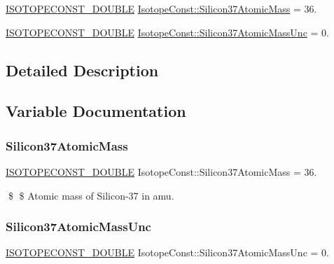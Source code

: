 \begin{DoxyCompactItemize}
\item 
\mbox{\hyperlink{group___isotope_const-_macros_ga8f45a7272ce02c0b4c65c44636ed719a}{I\+S\+O\+T\+O\+P\+E\+C\+O\+N\+S\+T\+\_\+\+D\+O\+U\+B\+LE}} \mbox{\hyperlink{group___isotope_const-_silicon-_si37_gaab3633657f6d05bbedd5118100ca326c}{Isotope\+Const\+::\+Silicon37\+Atomic\+Mass}} = 36.
\item 
\mbox{\hyperlink{group___isotope_const-_macros_ga8f45a7272ce02c0b4c65c44636ed719a}{I\+S\+O\+T\+O\+P\+E\+C\+O\+N\+S\+T\+\_\+\+D\+O\+U\+B\+LE}} \mbox{\hyperlink{group___isotope_const-_silicon-_si37_gaa46a1d41cb6ac6a76ff8424a2a5dbd29}{Isotope\+Const\+::\+Silicon37\+Atomic\+Mass\+Unc}} = 0.
\end{DoxyCompactItemize}


\subsection{Detailed Description}


\subsection{Variable Documentation}
\mbox{\label{group___isotope_const-_silicon-_si37_gaab3633657f6d05bbedd5118100ca326c}} 
\subsubsection{\texorpdfstring{Silicon37\+Atomic\+Mass}{Silicon37AtomicMass}}
{\footnotesize\ttfamily \mbox{\hyperlink{group___isotope_const-_macros_ga8f45a7272ce02c0b4c65c44636ed719a}{I\+S\+O\+T\+O\+P\+E\+C\+O\+N\+S\+T\+\_\+\+D\+O\+U\+B\+LE}} Isotope\+Const\+::\+Silicon37\+Atomic\+Mass = 36.}

\$ \$ Atomic mass of Silicon-\/37 in amu. \mbox{\label{group___isotope_const-_silicon-_si37_gaa46a1d41cb6ac6a76ff8424a2a5dbd29}} 
\subsubsection{\texorpdfstring{Silicon37\+Atomic\+Mass\+Unc}{Silicon37AtomicMassUnc}}
{\footnotesize\ttfamily \mbox{\hyperlink{group___isotope_const-_macros_ga8f45a7272ce02c0b4c65c44636ed719a}{I\+S\+O\+T\+O\+P\+E\+C\+O\+N\+S\+T\+\_\+\+D\+O\+U\+B\+LE}} Isotope\+Const\+::\+Silicon37\+Atomic\+Mass\+Unc = 0.}

